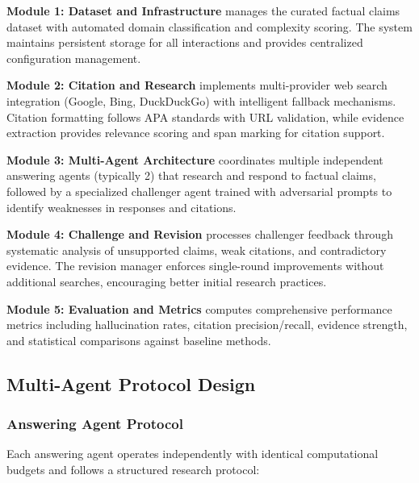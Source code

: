 \documentclass[11pt,a4paper]{article}
\begin{document}
\textbf{Module 1: Dataset and Infrastructure} manages the curated factual claims dataset with automated domain classification and complexity scoring. The system maintains persistent storage for all interactions and provides centralized configuration management.

\textbf{Module 2: Citation and Research} implements multi-provider web search integration (Google, Bing, DuckDuckGo) with intelligent fallback mechanisms. Citation formatting follows APA standards with URL validation, while evidence extraction provides relevance scoring and span marking for citation support.

\textbf{Module 3: Multi-Agent Architecture} coordinates multiple independent answering agents (typically 2) that research and respond to factual claims, followed by a specialized challenger agent trained with adversarial prompts to identify weaknesses in responses and citations.

\textbf{Module 4: Challenge and Revision} processes challenger feedback through systematic analysis of unsupported claims, weak citations, and contradictory evidence. The revision manager enforces single-round improvements without additional searches, encouraging better initial research practices.

\textbf{Module 5: Evaluation and Metrics} computes comprehensive performance metrics including hallucination rates, citation precision/recall, evidence strength, and statistical comparisons against baseline methods.

\subsection{Multi-Agent Protocol Design}

\subsubsection{Answering Agent Protocol}

Each answering agent operates independently with identical computational budgets and follows a structured research protocol:
\end{document}
